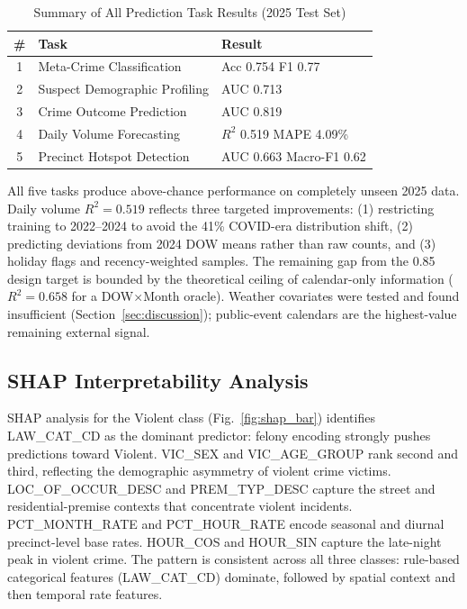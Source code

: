 \documentclass[conference]{IEEEtran}
\begin{document}
\begin{table}[h]
\centering
\caption{Summary of All Prediction Task Results (2025 Test Set)}
\label{tab:summary}
\begin{tabular}{@{}cll@{}}
\toprule
\textbf{\#} & \textbf{Task} & \textbf{Result} \\
\midrule
1 & Meta-Crime Classification & Acc 0.754 \quad F1 0.77 \\
2 & Suspect Demographic Profiling & AUC 0.713 \\
3 & Crime Outcome Prediction & AUC 0.819 \\
4 & Daily Volume Forecasting & $R^2$ 0.519 \quad MAPE 4.09\% \\
5 & Precinct Hotspot Detection & AUC 0.663 \quad Macro-F1 0.62 \\
\bottomrule
\end{tabular}
\end{table}

All five tasks produce above-chance performance on completely unseen 2025 data. Daily volume $R^2 = 0.519$ reflects three targeted improvements: (1) restricting training to 2022--2024 to avoid the 41\% COVID-era distribution shift, (2) predicting deviations from 2024 DOW means rather than raw counts, and (3) holiday flags and recency-weighted samples. The remaining gap from the 0.85 design target is bounded by the theoretical ceiling of calendar-only information ($R^2 = 0.658$ for a DOW$\times$Month oracle). Weather covariates were tested and found insufficient (Section~\ref{sec:discussion}); public-event calendars are the highest-value remaining external signal.

\subsection{SHAP Interpretability Analysis}

SHAP analysis for the Violent class (Fig.~\ref{fig:shap_bar}) identifies LAW\_CAT\_CD as the dominant predictor: felony encoding strongly pushes predictions toward Violent. VIC\_SEX and VIC\_AGE\_GROUP rank second and third, reflecting the demographic asymmetry of violent crime victims. LOC\_OF\_OCCUR\_DESC and PREM\_TYP\_DESC capture the street and residential-premise contexts that concentrate violent incidents. PCT\_MONTH\_RATE and PCT\_HOUR\_RATE encode seasonal and diurnal precinct-level base rates. HOUR\_COS and HOUR\_SIN capture the late-night peak in violent crime. The pattern is consistent across all three classes: rule-based categorical features (LAW\_CAT\_CD) dominate, followed by spatial context and then temporal rate features.
\end{document}
